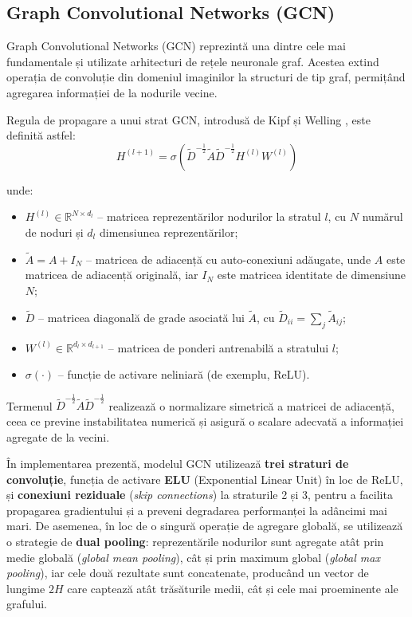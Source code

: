 \documentclass[12pt,a4paper]{report}
\theoremstyle{definition}
\theoremstyle{remark}
\begin{document}
\subsection{Graph Convolutional Networks (GCN)}

Graph Convolutional Networks (GCN) reprezintă una dintre cele mai fundamentale și utilizate arhitecturi de rețele neuronale graf. Acestea extind operația de convoluție din domeniul imaginilor la structuri de tip graf, permițând agregarea informației de la nodurile vecine.

Regula de propagare a unui strat GCN, introdusă de Kipf și Welling \cite{kipf2017semi}, este definită astfel:
\begin{equation}
    H^{(l+1)} = \sigma\left(\tilde{D}^{-\frac{1}{2}} \tilde{A} \tilde{D}^{-\frac{1}{2}} H^{(l)} W^{(l)}\right)
    \label{eq:gcn}
\end{equation}

\noindent unde:
\begin{itemize}
    \item $H^{(l)} \in \mathbb{R}^{N \times d_l}$ -- matricea reprezentărilor nodurilor la stratul $l$, cu $N$ numărul de noduri și $d_l$ dimensiunea reprezentărilor;
    \item $\tilde{A} = A + I_N$ -- matricea de adiacență cu auto-conexiuni adăugate, unde $A$ este matricea de adiacență originală, iar $I_N$ este matricea identitate de dimensiune $N$;
    \item $\tilde{D}$ -- matricea diagonală de grade asociată lui $\tilde{A}$, cu $\tilde{D}_{ii} = \sum_j \tilde{A}_{ij}$;
    \item $W^{(l)} \in \mathbb{R}^{d_l \times d_{l+1}}$ -- matricea de ponderi antrenabilă a stratului $l$;
    \item $\sigma(\cdot)$ -- funcție de activare neliniară (de exemplu, ReLU).
\end{itemize}

Termenul $\tilde{D}^{-\frac{1}{2}} \tilde{A} \tilde{D}^{-\frac{1}{2}}$ realizează o normalizare simetrică a matricei de adiacență, ceea ce previne instabilitatea numerică și asigură o scalare adecvată a informației agregate de la vecini.

În implementarea prezentă, modelul GCN utilizează \textbf{trei straturi de convoluție}, funcția de activare \textbf{ELU} (Exponential Linear Unit) în loc de ReLU, și \textbf{conexiuni reziduale} (\textit{skip connections}) la straturile 2 și 3, pentru a facilita propagarea gradientului și a preveni degradarea performanței la adâncimi mai mari. De asemenea, în loc de o singură operație de agregare globală, se utilizează o strategie de \textbf{dual pooling}: reprezentările nodurilor sunt agregate atât prin medie globală (\textit{global mean pooling}), cât și prin maximum global (\textit{global max pooling}), iar cele două rezultate sunt concatenate, producând un vector de lungime $2H$ care captează atât trăsăturile medii, cât și cele mai proeminente ale grafului.
\end{document}
